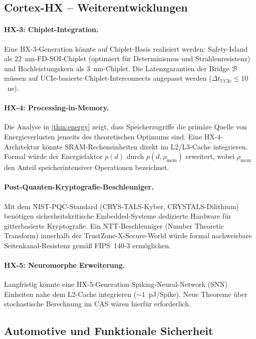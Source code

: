 ﻿\documentclass[a4paper,12pt]{article}
\theoremstyle{plain}
\theoremstyle{definition}
\theoremstyle{remark}
\begin{document}
\subsection{Cortex-HX -- Weiterentwicklungen}

\paragraph{HX-3: Chiplet-Integration.}
Eine HX-3-Generation k\"onnte auf Chiplet-Basis realisiert werden: Safety-Island
als 22~nm-FD-SOI-Chiplet (optimiert f\"ur Determinismus und Strahlenresistenz)
und Hochleistungskern als 3~nm-Chiplet. Die Latenzgarantien der Bridge $\mathcal{B}$
m\"ussen auf UCIe-basierte Chiplet-Interconnects angepasst werden
($\Delta t_\mathrm{UCIe}\leq10$~ns).

\paragraph{HX-4: Processing-in-Memory.}
Die Analyse in \cref{thm:energy} zeigt, dass Speicherzugriffe die prim\"are
Quelle von Energieverlusten jenseits des theoretischen Optimums sind. Eine
HX-4-Architektur k\"onnte SRAM-Recheneinheiten direkt im L2/L3-Cache integrieren.
Formal w\"urde der Energiefaktor $p(d)$ durch $p(d,\rho_\mathrm{mem})$ erweitert,
wobei $\rho_\mathrm{mem}$ den Anteil speicherintensiver Operationen bezeichnet.

\paragraph{Post-Quanten-Kryptografie-Beschleuniger.}
Mit dem NIST-PQC-Standard (CRYS-\newline TALS-Kyber, CRYSTALS-Dilithium) ben\"otigen
sicherheitskritische Embedded-Systeme dedizierte Hardware f\"ur gitterbasierte
Kryptografie. Ein NTT-Beschleuniger (Number Theoretic Transform) innerhalb
der TrustZone-X-Secure-World w\"urde formal nachweisbare Seitenkanal-Resistenz
gem\"a\ss{} FIPS~140-3 erm\"oglichen.

\paragraph{HX-5: Neuromorphe Erweiterung.}
Langfristig k\"onnte eine HX-5-Generation Spiking-Neural-Network (SNN) Einheiten
nahe dem L2-Cache integrieren ($\sim1$~pJ/Spike). Neue Theoreme \"uber
stochastische Berechnung im CAS w\"aren hierf\"ur erforderlich.

\subsection{Automotive und Funktionale Sicherheit}
\end{document}
